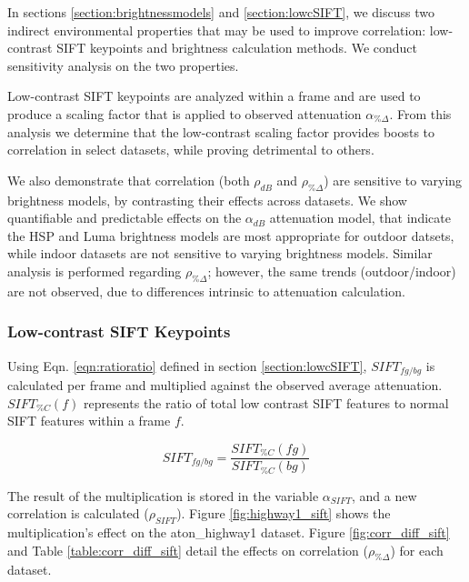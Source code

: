 In sections \ref{section:brightnessmodels} and \ref{section:lowcSIFT}, we discuss two indirect environmental properties that may be used to improve correlation: low-contrast SIFT keypoints and brightness calculation methods. We conduct sensitivity analysis on the two properties.

Low-contrast SIFT keypoints are analyzed within a frame and are used to produce a scaling factor that is applied to observed attenuation $\alpha_{\%\Delta}$. From this analysis we determine that the low-contrast scaling factor provides boosts to correlation in select datasets, while proving detrimental to others.

We also demonstrate that correlation (both $\rho_{dB}$ and $\rho_{\%\Delta}$) are sensitive to varying brightness models, by contrasting their effects across datasets. We show quantifiable and predictable effects on the $\alpha_{dB}$ attenuation model, that indicate the HSP and Luma brightness models are most appropriate for outdoor datsets, while indoor datasets are not sensitive to varying brightness models. Similar analysis is performed regarding $\rho_{\%\Delta}$; however, the same trends (outdoor/indoor) are not observed, due to differences intrinsic to attenuation calculation.

\subsubsection{Low-contrast SIFT Keypoints} \label{section:lowcsensitivity}

Using Eqn. \ref{eqn:ratioratio} defined in section \ref{section:lowcSIFT}, $SIFT_{fg/bg}$ is calculated per frame and multiplied against the observed average attenuation. $SIFT_{\%C}(f)$ represents the ratio of total low contrast SIFT features to normal SIFT features within a frame $f$.

\begin{equation}
SIFT_{fg/bg} = \dfrac{SIFT_{\%C}(fg)}{SIFT_{\%C}(bg)}
\end{equation}

The result of the multiplication is stored in the variable $\alpha_{SIFT}$, and a new correlation is calculated ($\rho_{SIFT}$). Figure \ref{fig:highway1_sift} shows the multiplication's effect on the aton\_highway1 dataset. Figure \ref{fig:corr_diff_sift} and Table \ref{table:corr_diff_sift} detail the effects on correlation ($\rho_{\%\Delta}$) for each dataset.

